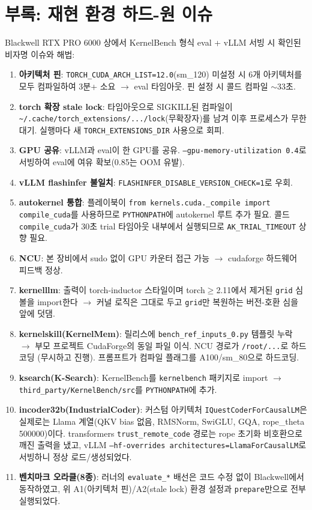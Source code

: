 \documentclass[11pt]{article}
\newcommand{\code}[1]{\texttt{\small #1}}
\begin{document}
\section{부록: 재현 환경 하드-원 이슈}
Blackwell RTX PRO 6000 상에서 KernelBench 형식 eval + vLLM 서빙 시 확인된 비자명 이슈와 해법:
\begin{enumerate}[label=A\arabic*.]
  \item \textbf{아키텍처 핀}: \code{TORCH\_CUDA\_ARCH\_LIST=12.0}(sm\_120) 미설정 시 6개 아키텍처를
        모두 컴파일하여 3분+ 소요 $\to$ eval 타임아웃. 핀 설정 시 콜드 컴파일 $\sim$33초.
  \item \textbf{torch 확장 stale lock}: 타임아웃으로 SIGKILL된 컴파일이
        \code{\textasciitilde/.cache/torch\_extensions/.../lock}(무확장자)를 남겨 이후 프로세스가 무한 대기.
        실행마다 새 \code{TORCH\_EXTENSIONS\_DIR} 사용으로 회피.
  \item \textbf{GPU 공유}: vLLM과 eval이 한 GPU를 공유. \code{--gpu-memory-utilization 0.4}로 서빙하여
        eval에 여유 확보(0.85는 OOM 유발).
  \item \textbf{vLLM flashinfer 불일치}: \code{FLASHINFER\_DISABLE\_VERSION\_CHECK=1}로 우회.
  \item \textbf{autokernel 통합}: 플레이북이 \code{from kernels.cuda.\_compile import compile\_cuda}를
        사용하므로 \code{PYTHONPATH}에 autokernel 루트 추가 필요. 콜드 \code{compile\_cuda}가 30초
        trial 타임아웃 내부에서 실행되므로 \code{AK\_TRIAL\_TIMEOUT} 상향 필요.
  \item \textbf{NCU}: 본 장비에서 sudo 없이 GPU 카운터 접근 가능 $\to$ cudaforge 하드웨어 피드백 정상.
  \item \textbf{kernelllm}: 출력이 torch-inductor 스타일이며 torch$\ge$2.11에서 제거된
        \code{grid} 심볼을 import한다 $\to$ 커널 로직은 그대로 두고 \code{grid}만 복원하는
        버전-호환 심을 앞에 덧댐.
  \item \textbf{kernelskill(KernelMem)}: 릴리스에 \code{bench\_ref\_inputs\_0.py} 템플릿 누락
        $\to$ 부모 프로젝트 CudaForge의 동일 파일 이식. NCU 경로가 \code{/root/...}로 하드코딩
        (무시하고 진행). 프롬프트가 컴파일 플래그를 A100/sm\_80으로 하드코딩.
  \item \textbf{ksearch(K-Search)}: KernelBench를 \code{kernelbench} 패키지로 import
        $\to$ \code{third\_party/KernelBench/src}를 \code{PYTHONPATH}에 추가.
  \item \textbf{incoder32b(IndustrialCoder)}: 커스텀 아키텍처 \code{IQuestCoderForCausalLM}은
        실제로는 Llama 계열(QKV bias 없음, RMSNorm, SwiGLU, GQA, rope\_theta 500000)이다.
        transformers \code{trust\_remote\_code} 경로는 rope 초기화 비호환으로 깨진 출력을 냈고,
        vLLM \code{--hf-overrides architectures=LlamaForCausalLM}로 서빙하니 정상 로드/생성되었다.
  \item \textbf{벤치마크 오라클(8종)}: 러너의 \code{evaluate\_*} 배선은 코드 수정 없이 Blackwell에서
        동작하였고, 위 A1(아키텍처 핀)/A2(stale lock) 환경 설정과 \code{prepare}만으로 전부 실행되었다.
\end{enumerate}
\end{document}
